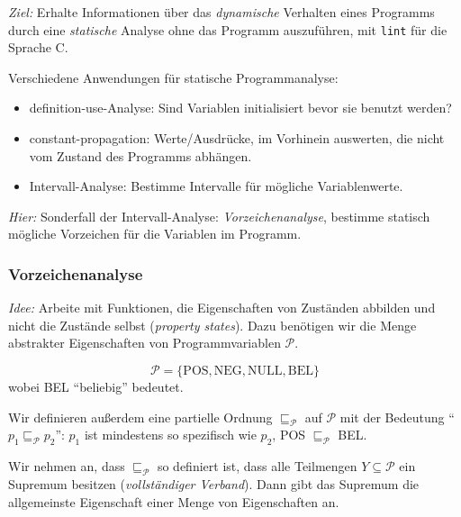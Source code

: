 \emph{Ziel:} Erhalte Informationen über das \emph{dynamische} Verhalten eines Programms durch eine \emph{statische} Analyse ohne das Programm auszuführen, \zb{} mit \texttt{lint} für die Sprache C.

\begin{example}
    Verschiedene Anwendungen für statische Programmanalyse:
    \begin{itemize}
        \item definition-use-Analyse: Sind Variablen initialisiert bevor sie benutzt werden?
        \item constant-propagation: Werte/Ausdrücke, im Vorhinein auswerten, die nicht vom Zustand des Programms abhängen.
        \item Intervall-Analyse: Bestimme Intervalle für mögliche Variablenwerte.
    \end{itemize}

\end{example}

\emph{Hier:} Sonderfall der Intervall-Analyse: \emph{Vorzeichenanalyse}, \dh{} bestimme statisch mögliche Vorzeichen für die Variablen im Programm.



\subsubsection{Vorzeichenanalyse}

\emph{Idee:} Arbeite mit Funktionen, die Eigenschaften von Zuständen abbilden und nicht die Zustände selbst (\emph{property states}). Dazu benötigen wir die Menge abstrakter Eigenschaften von Programmvariablen $\mathcal{P}$.

\par\medskip
\begin{definition} \label{def:vorzeichenanalyse}
    \[
    \mathcal{P} = \{ \text{POS}, \text{NEG}, \text{NULL}, \text{BEL} \}
    \]
    wobei BEL ``beliebig'' bedeutet.

    Wir definieren außerdem eine partielle Ordnung $\sqsubseteq_{\mathcal{P}}$ auf $\mathcal{P}$ mit der Bedeutung ``$p_1 \sqsubseteq_{\mathcal{P}} p_2$'': $p_1$ ist mindestens so spezifisch wie $p_2$, \zb{} POS $\sqsubseteq_{\mathcal{P}}$ BEL.

    Wir nehmen an, dass $\sqsubseteq_{\mathcal{P}}$ so definiert ist, dass alle Teilmengen $Y \subseteq \mathcal{P}$ ein Supremum besitzen (\emph{vollständiger Verband}). Dann gibt das Supremum die allgemeinste Eigenschaft einer Menge von Eigenschaften an.
\end{definition}

